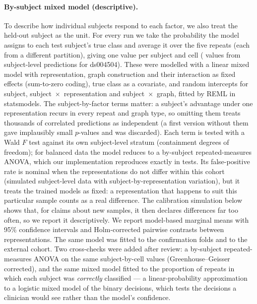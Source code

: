 \paragraph{By-subject mixed model (descriptive).} To describe how individual subjects respond to each
factor, we also treat the held-out subject as the unit. For every run
we take the probability the model assigns to each test subject's true class and average it over the
five repeats (each from a different partition), giving one value per subject and cell
(\mixSelNRows{} values from \mixSelNScores{} subject-level predictions for ds004504). These were modelled
with a linear mixed model with representation, graph construction and their interaction as fixed
effects (sum-to-zero coding), true class as a covariate, and random intercepts for subject,
subject~$\times$~representation and subject~$\times$~graph, fitted by REML in statsmodels. The
subject-by-factor terms matter: a subject's advantage under one representation recurs in every repeat
and graph type, so omitting them treats thousands of correlated predictions as independent (a first
version without them gave implausibly small $p$-values and was discarded). Each term is tested with a
Wald $F$ test against its own subject-level stratum (containment degrees of freedom); for balanced data
the model reduces to a by-subject repeated-measures ANOVA, which our implementation reproduces
exactly in tests. Its false-positive rate is nominal when the representations do not differ within this
cohort (simulated subject-level data with subject-by-representation variation), but it treats the trained
models as fixed: a representation that happens to suit this particular sample counts as a real difference.
The calibration simulation below shows that, for claims about new samples, it then declares differences far
too often, so we report it descriptively. We report model-based marginal means with 95\% confidence intervals and Holm-corrected
pairwise contrasts between representations. The same model was fitted to the confirmation folds and to
the external cohort. Two cross-checks were added after review: a by-subject repeated-measures ANOVA on
the same subject-by-cell values (Greenhouse--Geisser corrected), and the same mixed model fitted to the
proportion of repeats in which each subject was \emph{correctly} classified --- a linear-probability
approximation to a logistic mixed model of the binary decisions, which tests the decisions a clinician
would see rather than the model's confidence.


